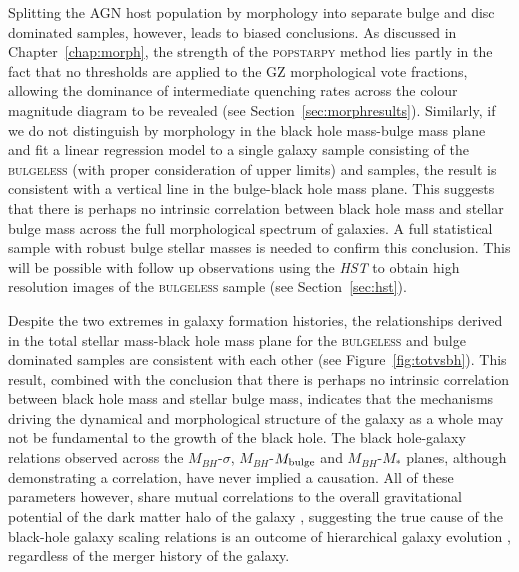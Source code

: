 {Splitting the AGN host population by morphology into separate bulge and disc dominated samples, however, leads to biased conclusions. As discussed in Chapter~\ref{chap:morph}, the strength of the \textsc{popstarpy} method lies partly in the fact that no thresholds are applied to the GZ morphological vote fractions, allowing the dominance of intermediate quenching rates across the colour magnitude diagram to be revealed (see Section~\ref{sec:morphresults}). Similarly, if we do not distinguish by morphology in the black hole mass-bulge mass plane and fit a linear regression model to a single galaxy sample consisting of the \textsc{bulgeless} (with proper consideration of upper limits) and \citet{haringrix04} samples, the result is consistent with a vertical line in the bulge-black hole mass plane. This suggests that there is perhaps no intrinsic correlation between black hole mass and stellar bulge mass across the full morphological spectrum of galaxies. A full statistical sample with robust bulge stellar masses is needed to confirm this conclusion. This will be possible with follow up observations using the \emph{HST} to obtain high resolution images of the \textsc{bulgeless} sample (see Section~\ref{sec:hst}). 

Despite the two extremes in galaxy formation histories, the relationships derived in the total stellar mass-black hole mass plane for the \textsc{bulgeless} and bulge dominated \citet{haringrix04} samples are consistent with each other (see Figure~\ref{fig:totvsbh}). This result, combined with the conclusion that there is perhaps no intrinsic correlation between black hole mass and stellar bulge mass, indicates that the mechanisms driving the dynamical and morphological structure of the galaxy as a whole may not be fundamental to the growth of the black hole. The black hole-galaxy relations observed across the $M_{BH}$-$\sigma$, $M_{BH}$-$M_{\rm{bulge}}$ and $M_{BH}$-$M_{*}$ planes, although demonstrating a correlation, have never implied a causation. All of these parameters however, share mutual correlations to the overall gravitational potential of the dark matter halo of the galaxy \citep{booth10, volonteri11}, suggesting the true cause of the black-hole galaxy scaling relations is an outcome of hierarchical galaxy evolution \citep{jahnke11}, regardless of the merger history of the galaxy. 

}
